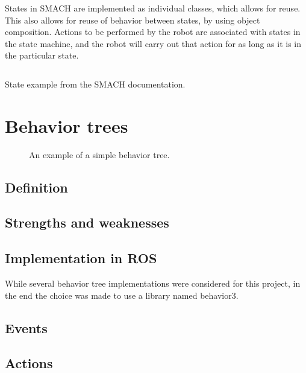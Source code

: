 \documentclass[\rootfolder/main.tex]{subfiles}
\begin{document}
States in SMACH are implemented as individual classes, which allows for reuse.
This also allows for reuse of behavior between states, by using object composition.
Actions to be performed by the robot are associated with states in the state machine, and the robot will carry out that action for as long as it is in the particular state.

\begin{listing}
\inputminted{python}{\rootfolder/Chapters/Chapter2/Listings/smachstate.py}
\caption{State example from the SMACH documentation.}
\end{listing}

\section{Behavior trees}

\begin{wrapfigure}{L}{0.5\columnwidth}
    \caption{An example of a simple behavior tree.}
    \label{fig:bt}
\end{wrapfigure}

\subsection{Definition}

\subsection{Strengths and weaknesses}

\subsection{Implementation in ROS}

While several behavior tree implementations were considered for this project, in the end the choice was made to use a library named behavior3.

\subsection{Events}

\subsection{Actions}

\end{document}
